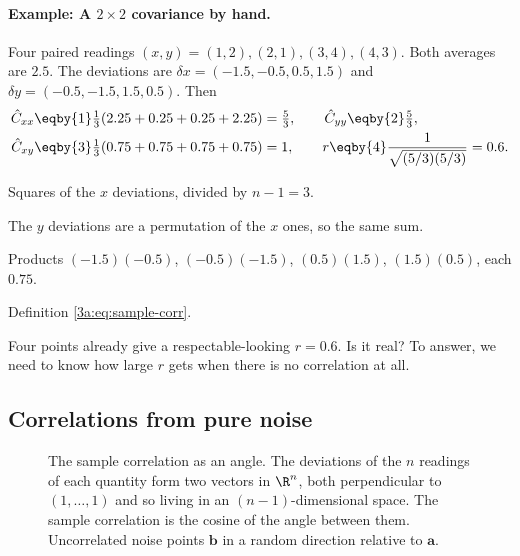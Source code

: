 \paragraph{Example: A $2\times2$ covariance by hand.}
\label{3a:ex:cov-hand}
Four paired readings $(x,y)=(1,2),(2,1),(3,4),(4,3)$. Both averages are
$2.5$. The deviations are $\delta x=(-1.5,-0.5,0.5,1.5)$ and
$\delta y=(-0.5,-1.5,1.5,0.5)$. Then
\begin{align*}
  \hat C_{xx} &\eqby{1} \tfrac13(2.25+0.25+0.25+2.25)=\tfrac53,\qquad
  \hat C_{yy}\eqby{2}\tfrac53,\\
  \hat C_{xy} &\eqby{3} \tfrac13(0.75+0.75+0.75+0.75)=1,\qquad
  r \eqby{4} \frac{1}{\sqrt{(5/3)(5/3)}}=0.6 .
\end{align*}
\begin{explain}
  \item Squares of the $x$ deviations, divided by $n-1=3$.
  \item The $y$ deviations are a permutation of the $x$ ones, so the same sum.
  \item Products $(-1.5)(-0.5)$, $(-0.5)(-1.5)$, $(0.5)(1.5)$, $(1.5)(0.5)$, each $0.75$.
  \item Definition \eqref{3a:eq:sample-corr}.
\end{explain}
Four points already give a respectable-looking $r=0.6$. Is it real? To
answer, we need to know how large $r$ gets when there is no correlation at
all.

\subsection{Correlations from pure noise}
\label{3a:sec:spurious}

\begin{figure}[htbp]
\centering
{}
\caption{The sample correlation as an angle. The deviations of the $n$
readings of each quantity form two vectors in $\R^n$, both perpendicular to
$(1,\dots,1)$ and so living in an $(n-1)$-dimensional space. The sample
correlation is the cosine of the angle between them. Uncorrelated noise
points $\bm b$ in a random direction relative to $\bm a$.}
\label{3a:fig:corr-angle}
\end{figure}

